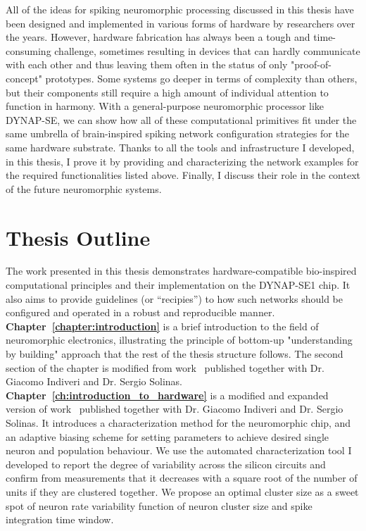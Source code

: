 All of the ideas for spiking neuromorphic processing discussed in this thesis have been designed and implemented in various forms of hardware by researchers over the years. However, hardware fabrication has always been a tough and time-consuming challenge, sometimes resulting in devices that can hardly communicate with each other and thus leaving them often in the status of only "proof-of-concept" prototypes. Some systems go deeper in terms of complexity than others, but their components still require a high amount of individual attention to function in harmony. With a general-purpose neuromorphic processor like DYNAP-SE, we can show how all of these computational primitives fit under the same umbrella of brain-inspired spiking network configuration strategies for the same hardware substrate. Thanks to all the tools and infrastructure I developed, in this thesis, I prove it by providing and characterizing the network examples for the required functionalities listed above. Finally, I discuss their role in the context of the future neuromorphic systems.


\newpage
\section*{Thesis Outline}

The work presented in this thesis demonstrates hardware-compatible bio-inspired computational principles and their implementation on the DYNAP-SE1 chip. It also aims to provide guidelines (or ``recipies'') to how such networks should be configured and operated in a robust and reproducible manner.\\

\textbf{Chapter~\ref{chapter:introduction}} is a brief introduction to the field of neuromorphic electronics, illustrating the principle of bottom-up "understanding by building" approach that the rest of the thesis structure follows. The second section of the chapter is modified from work~\cite{Zendrikov_etal23} published together with Dr. Giacomo Indiveri and Dr. Sergio Solinas.\\

\textbf{Chapter~\ref{ch:introduction_to_hardware}} is a modified and expanded version of work~\cite{Zendrikov_etal23} published together with Dr. Giacomo Indiveri and Dr. Sergio Solinas. It introduces a characterization method for the neuromorphic chip, and an adaptive biasing scheme for setting parameters to achieve desired single neuron and population behaviour. We use the automated characterization tool I developed to report the degree of variability across the silicon circuits and confirm from measurements that it decreases with a square root of the number of units if they are clustered together. We propose an optimal cluster size as a sweet spot of neuron rate variability function of neuron cluster size and spike integration time window.\\

